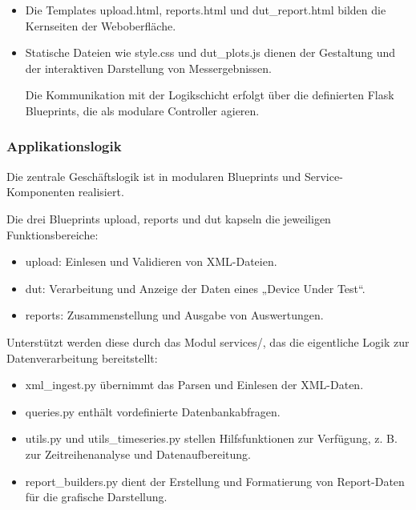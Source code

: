 \begin{itemize}

\item
Die Templates upload.html, reports.html und dut\_report.html bilden die Kernseiten der Weboberfläche.

\item
Statische Dateien wie style.css und dut\_plots.js dienen der Gestaltung und der interaktiven Darstellung von Messergebnissen.

Die Kommunikation mit der Logikschicht erfolgt über die definierten Flask Blueprints, die als modulare Controller agieren.

\end{itemize}

\subsubsection{Applikationslogik}

Die zentrale Geschäftslogik ist in modularen Blueprints und Service-Komponenten realisiert.

Die drei Blueprints upload, reports und dut kapseln die jeweiligen Funktionsbereiche:

\begin{itemize}

\item
upload: Einlesen und Validieren von XML-Dateien.

\item
dut: Verarbeitung und Anzeige der Daten eines „Device Under Test“.

\item
reports: Zusammenstellung und Ausgabe von Auswertungen.

\end{itemize}

Unterstützt werden diese durch das Modul services/, das die eigentliche Logik zur Datenverarbeitung bereitstellt:

\begin{itemize}

\item
xml\_ingest.py übernimmt das Parsen und Einlesen der XML-Daten.

\item
queries.py enthält vordefinierte Datenbankabfragen.

\item
utils.py und utils\_timeseries.py stellen Hilfsfunktionen zur Verfügung, z. B. zur Zeitreihenanalyse und Datenaufbereitung.

\item
report\_builders.py dient der Erstellung und Formatierung von Report-Daten für die grafische Darstellung.

\end{itemize}

